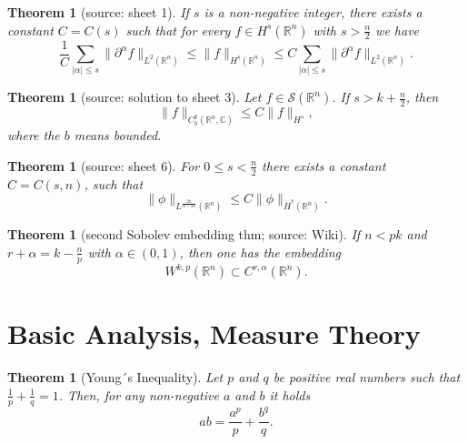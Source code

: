 \documentclass[12pt,a4paper]{article}
\newtheorem{thm}[definition]{Theorem}
\newcommand{\Rn}{\mathbb{R}^n}
\begin{document}
\begin{thm}[source: sheet 1]
If $s$ is a non-negative integer, there exists a constant $C=C(s)$ such that for every $f\in H^s(\mathbb{R}^n)$ with $s>\frac{n}{2}$ we have
\begin{equation}
\frac{1}{C} \sum_{\lvert\alpha\rvert\leq s} \lVert \partial ^{\alpha} f \rVert_{L^2(\mathbb{R}^n)} \leq \lVert f \rVert _{H^s(\mathbb{R}^n)} \leq C \sum_{\lvert\alpha\rvert\leq s} \lVert \partial ^{\alpha} f \rVert_{L^2(\mathbb{R}^n)}.
\end{equation}
\end{thm}

\begin{thm}[source: solution to sheet 3]
Let $f \in \mathcal{S}(\mathbb{R}^n)$. If $s>k+\frac{n}{2}$, then
\begin{equation}
\lVert f \rVert_{C_b^k(\Rn,\mathbb{C})}\leq C \lVert f \rVert_{H^s},
\end{equation}
where the $b$ means bounded.
\end{thm}

\begin{thm}[source: sheet 6]
For $0\leq s<\frac{n}{2}$ there exists a constant $C=C(s,n)$, such that
\begin{equation}
\lVert \phi \rVert_{L^{\frac{2n}{n-2s}}(\Rn)} \leq C\lVert \phi \rVert_{\dot H^s(\Rn)}.
\end{equation}
\end{thm}

\begin{thm}[second Sobolev embedding thm; source: Wiki]
If $n<pk$ and $r+\alpha=k-\frac{n}{p}$ with $\alpha \in (0,1)$, then one has the embedding
\begin{equation}
W^{k,p}(\mathbb{R}^n) \subset C^{r,\alpha}(\mathbb{R}^n).
\end{equation}
\end{thm}


\section{Basic Analysis, Measure Theory}

\begin{thm}[Young´s Inequality]
Let $p$ and $q$ be positive real numbers such that $\frac{1}{p} + \frac{1}{q} = 1$. Then, for any non-negative $a$ and $b$ it holds
\begin{equation}
ab=\frac{a^p}{p}+\frac{b^q}{q}.
\end{equation}
\end{thm}
\end{document}
